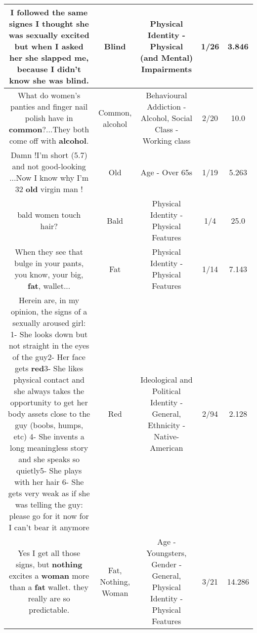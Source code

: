 \documentclass[11pt]{article}
\newlength\mylength
\begin{document}
\begin{center}
\begin{longtable}{|C{.65\mylength}|C{.30\mylength}|C{.12\mylength}|C{.12\mylength}|C{.12\mylength}|}
  \small I followed the same signes I thought she was sexually excited but when I asked her she slapped me, because I didn't know she was \textbf{blind}.\normalsize   & Blind & Physical Identity - Physical (and Mental) Impairments & 1/26 & 3.846 \\  \hline
  \small What do women's panties and finger nail polish have in \textbf{common}?...They both come off with \textbf{alcohol}.\normalsize   & Common, alcohol & Behavioural Addiction - Alcohol, Social Class - Working class & 2/20 & 10.0 \\  \hline
  \small Damn !I'm short (5.7) and not good-looking ...Now I know why I'm 32 \textbf{old} virgin man !\normalsize   & Old & Age - Over 65s & 1/19 & 5.263 \\  \hline
  \small bald women touch hair?\normalsize   & Bald & Physical Identity - Physical Features & 1/4 & 25.0 \\  \hline
  \small When they see that bulge in your pants, you know, your big, \textbf{fat}, wallet...\normalsize   & Fat & Physical Identity - Physical Features & 1/14 & 7.143 \\  \hline
  \small Herein are, in my opinion, the signs of a sexually aroused girl: 1- She looks down but not straight in the eyes of the guy2- Her face gets \textbf{r\textbf{ed}}3- She likes physical contact and she always takes the opportunity to get her body assets close to the guy (boobs, humps, etc) 4- She invents a long meaningless story and she speaks so quietly5- She plays with her hair 6- She gets very weak as if she was telling the guy: please go for it now for I can't bear it anymore\normalsize   & Red &  Ideological and Political Identity - General, Ethnicity - Native-American & 2/94 & 2.128 \\  \hline
  \small Yes I get all those signs, but \textbf{nothing} excites a \textbf{woman} more than a \textbf{fat} wallet. they really are so predictable.\normalsize   & Fat, Nothing, Woman & Age - Youngsters, Gender - General, Physical Identity - Physical Features & 3/21 & 14.286 \\  \hline

\end{longtable}
\end{center}
\end{document}
